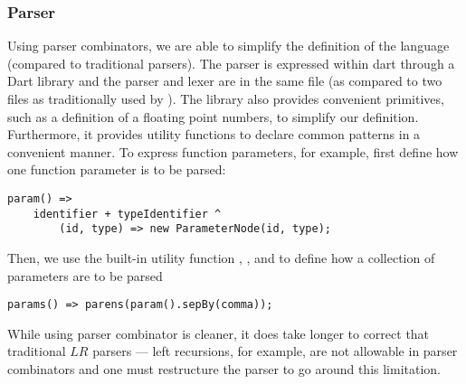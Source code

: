 \subsubsection{Parser}

Using parser combinators, we are able to simplify the definition of 
	the language (compared to traditional  parsers).
The parser is expressed within dart through a Dart library and
	the parser and lexer are in the same file (as compared to two
	files as traditionally used by ).
The library also provides convenient primitives, such as a definition of
	a floating point numbers, to simplify our definition.
Furthermore, it provides utility functions to declare common patterns
	in a convenient manner.
To express function parameters, for example, first define how one function
	parameter is to be parsed:

\begin{verbatim}
param() =>
	identifier + typeIdentifier ^
		(id, type) => new ParameterNode(id, type); 
\end{verbatim}

Then, we use the built-in utility function , ,
	and  to define how a collection of parameters are
	to be parsed

\begin{verbatim}
params() => parens(param().sepBy(comma));
\end{verbatim}

While using parser combinator is cleaner, it does take longer to correct
	that traditional $LR$ parsers --- left recursions, for example, are
	not allowable in parser combinators and one must restructure the parser
	to go around this limitation.
